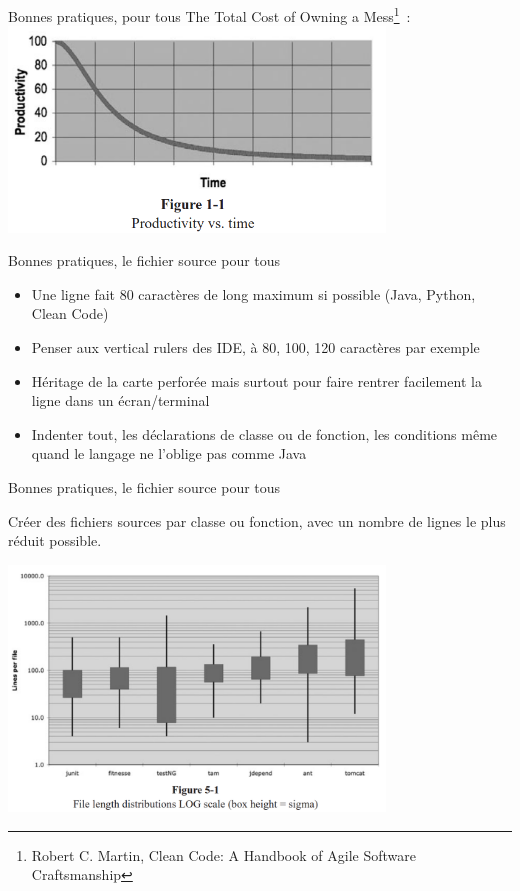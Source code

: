 \documentclass{beamer}
\begin{document}
    \begin{frame}{Bonnes pratiques, pour tous}
        The Total Cost of Owning a Mess\footnote{Robert C. Martin, Clean Code: A Handbook of Agile Software Craftsmanship}~:
        \bigbreak
        \centering
        \includegraphics[width=10cm]{image/total-cost-of-a-mess}
    \end{frame}

    \begin{frame}{Bonnes pratiques, le fichier source pour tous}
        \begin{itemize}

            \item Une ligne fait 80 caractères de long maximum si possible (Java, Python, Clean Code)
            \item Penser aux vertical rulers des IDE, à 80, 100, 120 caractères par exemple
            \item Héritage de la carte perforée mais surtout pour faire rentrer facilement la ligne dans un écran/terminal
            \item Indenter tout, les déclarations de classe ou de fonction, les conditions même quand le langage ne l'oblige pas comme Java

        \end{itemize}
    \end{frame}

    \begin{frame}{Bonnes pratiques, le fichier source pour tous}

        Créer des fichiers sources par classe ou fonction, avec un nombre de lignes le plus réduit possible.

        \bigbreak
        \centering
        \includegraphics[width=10cm]{image/project-source-length}

    \end{frame}
\end{document}
